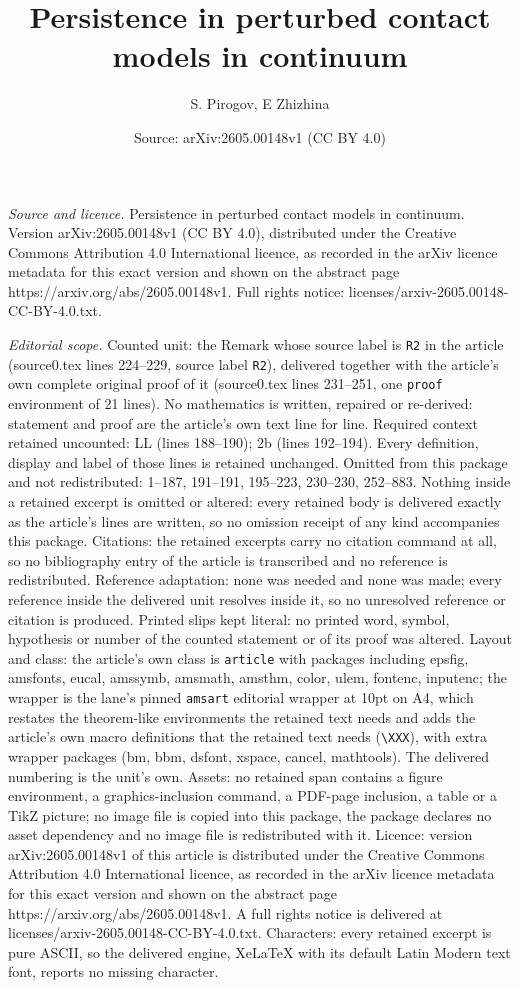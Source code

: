 \documentclass[10pt,a4paper]{amsart}
\title[Persistence in perturbed contact models in continuum]{Persistence in perturbed contact models in continuum}
\author{S. Pirogov, E Zhizhina}
\date{Source: arXiv:2605.00148v1 (CC BY 4.0)}
\begin{document}
\maketitle

\noindent\emph{Source and licence.} Persistence in perturbed contact models in continuum. Version arXiv:2605.00148v1 (CC BY 4.0), distributed under the Creative Commons Attribution 4.0 International licence, as recorded in the arXiv licence metadata for this exact version and shown on the abstract page https://arxiv.org/abs/2605.00148v1. Full rights notice: licenses/arxiv-2605.00148-CC-BY-4.0.txt.\par\smallskip

\noindent\textit{Editorial scope.} Counted unit: the Remark whose source label is \texttt{R2} in the article (source0.tex lines 224--229, source label \texttt{R2}), delivered together with the article's own complete original proof of it (source0.tex lines 231--251, one \texttt{proof} environment of 21 lines). No mathematics is written, repaired or re-derived: statement and proof are the article's own text line for line. Required context retained uncounted: LL (lines 188--190); 2b (lines 192--194). Every definition, display and label of those lines is retained unchanged. Omitted from this package and not redistributed: 1--187, 191--191, 195--223, 230--230, 252--883. Nothing inside a retained excerpt is omitted or altered: every retained body is delivered exactly as the article's lines are written, so no omission receipt of any kind accompanies this package. Citations: the retained excerpts carry no citation command at all, so no bibliography entry of the article is transcribed and no reference is redistributed. Reference adaptation: none was needed and none was made; every reference inside the delivered unit resolves inside it, so no unresolved reference or citation is produced. Printed slips kept literal: no printed word, symbol, hypothesis or number of the counted statement or of its proof was altered. Layout and class: the article's own class is \texttt{article} with packages including epsfig, amsfonts, eucal, amssymb, amsmath, amsthm, color, ulem, fontenc, inputenc; the wrapper is the lane's pinned \texttt{amsart} editorial wrapper at 10pt on A4, which restates the theorem-like environments the retained text needs and adds the article's own macro definitions that the retained text needs (\texttt{\textbackslash XXX}), with extra wrapper packages (bm, bbm, dsfont, xspace, cancel, mathtools). The delivered numbering is the unit's own. Assets: no retained span contains a figure environment, a graphics-inclusion command, a PDF-page inclusion, a table or a TikZ picture; no image file is copied into this package, the package declares no asset dependency and no image file is redistributed with it. Licence: version arXiv:2605.00148v1 of this article is distributed under the Creative Commons Attribution 4.0 International licence, as recorded in the arXiv licence metadata for this exact version and shown on the abstract page https://arxiv.org/abs/2605.00148v1. A full rights notice is delivered at licenses/arxiv-2605.00148-CC-BY-4.0.txt. Characters: every retained excerpt is pure ASCII, so the delivered engine, XeLaTeX with its default Latin Modern text font, reports no missing character.
\end{document}
